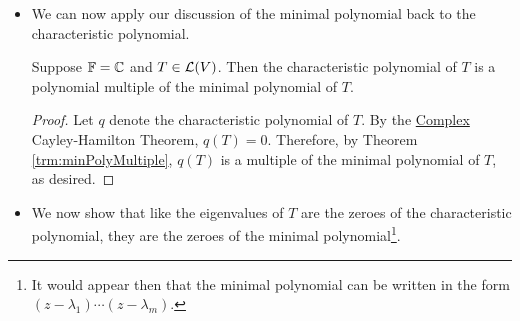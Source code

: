 \documentclass[../main.tex]{subfiles}
\begin{document}
\begin{itemize}
    \begin{theorem}\label{trm:minPolyMultiple}
        Suppose $T\in\ope{V}$ and $q\in\pol{\F}$. Then $q(T)=0$ if and only if $q$ is a polynomial multiple of the minimal polynomial of $T$.
        \begin{proof}
            Let $p$ denote the minimal polynomial of $T$.\par
            Suppose first that $q(T)=0$. By the \hyperref[trm:DivisionAlgorithmforPolynomials]{Division Algorithm for Polynomials}, we have that $q=ps+r$ where $\deg r<\deg p$. Thus,
            \begin{equation*}
                0 = q(T) = p(T)s(T)+r(T) = r(T)
            \end{equation*}
            It follows that $r=0$ (otherwise, since $\deg r<\deg p$, $r$ divided by the coefficient of the highest-order term would be a monic polynomial that when applied to $T$ of degree less than minimal polynomial, a contradiction). Therefore, $q$ is a polynomial multiple of the minimal polynomial of $T$, as desired.\par
            Now suppose that $q$ is a polynomial multiple of the minimal polynomial of $T$. The $q=ps$ for some $s\in\pol{\F}$. It follows that
            \begin{equation*}
                q(T) = p(T)s(T) = 0s(T) = 0
            \end{equation*}
            as desired.
        \end{proof}
    \end{theorem}
    \item We can now apply our discussion of the minimal polynomial back to the characteristic polynomial.
    \begin{theorem}
        Suppose $\mathbb{F}=\mathbb{C}$ and $T\in\ope{V}$. Then the characteristic polynomial of $T$ is a polynomial multiple of the minimal polynomial of $T$.
        \begin{proof}
            Let $q$ denote the characteristic polynomial of $T$. By the \hyperref[trm:ComplexCayleyHamilton]{Complex} Cayley-Hamilton Theorem, $q(T)=0$. Therefore, by Theorem \ref{trm:minPolyMultiple}, $q(T)$ is a multiple of the minimal polynomial of $T$, as desired.
        \end{proof}
    \end{theorem}
    \item We now show that like the eigenvalues of $T$ are the zeroes of the characteristic polynomial, they are the zeroes of the minimal polynomial\footnote{It would appear then that the minimal polynomial can be written in the form $(z-\lambda_1)\cdots(z-\lambda_m)$.}.

\end{itemize}
\end{document}
